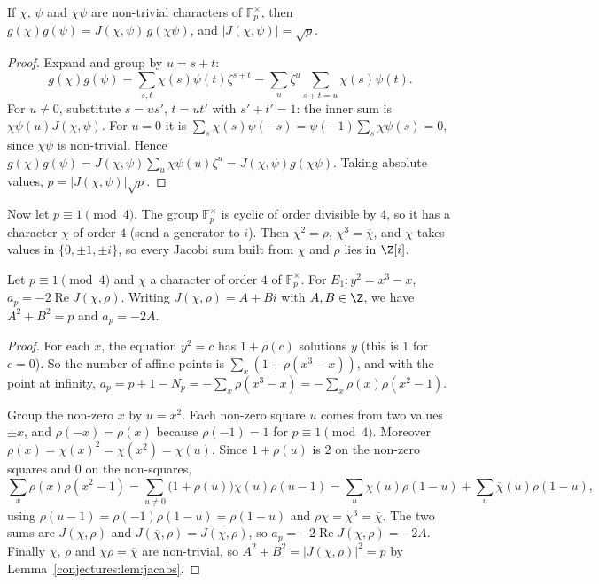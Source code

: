 \begin{lemma}\label{conjectures:lem:jacabs}
If $\chi$, $\psi$ and $\chi\psi$ are non-trivial characters of $\mathbb F_p^\times$, then $g(\chi)g(\psi)=J(\chi,\psi)\,g(\chi\psi)$, and $|J(\chi,\psi)|=\sqrt p$.
\end{lemma}
\begin{proof}
Expand and group by $u=s+t$:
\[
g(\chi)g(\psi)=\sum_{s,t}\chi(s)\psi(t)\zeta^{s+t}=\sum_u\zeta^u\sum_{s+t=u}\chi(s)\psi(t).
\]
For $u\ne0$, substitute $s=us'$, $t=ut'$ with $s'+t'=1$: the inner sum is $\chi\psi(u)J(\chi,\psi)$. For $u=0$ it is
$\sum_s\chi(s)\psi(-s)=\psi(-1)\sum_s\chi\psi(s)=0$, since $\chi\psi$ is non-trivial. Hence $g(\chi)g(\psi)=J(\chi,\psi)\sum_{u}\chi\psi(u)\zeta^u=J(\chi,\psi)g(\chi\psi)$.
Taking absolute values, $p=|J(\chi,\psi)|\sqrt p$.
\end{proof}

Now let $p\equiv1\pmod4$. The group $\mathbb F_p^\times$ is cyclic of order divisible by $4$, so it has a character $\chi$ of order $4$ (send a generator to $i$).
Then $\chi^2=\rho$, $\chi^3=\overline\chi$, and $\chi$ takes values in $\{0,\pm1,\pm i\}$, so every Jacobi sum built from $\chi$ and $\rho$ lies in $\Z[i]$.

\begin{lemma}\label{conjectures:lem:quarticap}
Let $p\equiv1\pmod4$ and $\chi$ a character of order $4$ of $\mathbb F_p^\times$. For $E_1:y^2=x^3-x$, $a_p=-2\operatorname{Re}J(\chi,\rho)$. Writing
$J(\chi,\rho)=A+Bi$ with $A,B\in\Z$, we have $A^2+B^2=p$ and $a_p=-2A$.
\end{lemma}
\begin{proof}
For each $x$, the equation $y^2=c$ has $1+\rho(c)$ solutions $y$ (this is $1$ for $c=0$). So the number of affine points is $\sum_x(1+\rho(x^3-x))$, and with
the point at infinity, $a_p=p+1-N_p=-\sum_x\rho(x^3-x)=-\sum_x\rho(x)\rho(x^2-1)$.

Group the non-zero $x$ by $u=x^2$. Each non-zero square $u$ comes from two values $\pm x$, and $\rho(-x)=\rho(x)$ because $\rho(-1)=1$ for $p\equiv1\pmod4$.
Moreover $\rho(x)=\chi(x)^2=\chi(x^2)=\chi(u)$. Since $1+\rho(u)$ is $2$ on the non-zero squares and $0$ on the non-squares,
\[
\sum_x\rho(x)\rho(x^2-1)=\sum_{u\ne0}\bigl(1+\rho(u)\bigr)\chi(u)\rho(u-1)=\sum_u\chi(u)\rho(1-u)+\sum_u\overline\chi(u)\rho(1-u),
\]
using $\rho(u-1)=\rho(-1)\rho(1-u)=\rho(1-u)$ and $\rho\chi=\chi^3=\overline\chi$. The two sums are $J(\chi,\rho)$ and $J(\overline\chi,\rho)=\overline{J(\chi,\rho)}$,
so $a_p=-2\operatorname{Re}J(\chi,\rho)=-2A$. Finally $\chi$, $\rho$ and $\chi\rho=\overline\chi$ are non-trivial, so $A^2+B^2=|J(\chi,\rho)|^2=p$ by
Lemma~\ref{conjectures:lem:jacabs}.
\end{proof}

